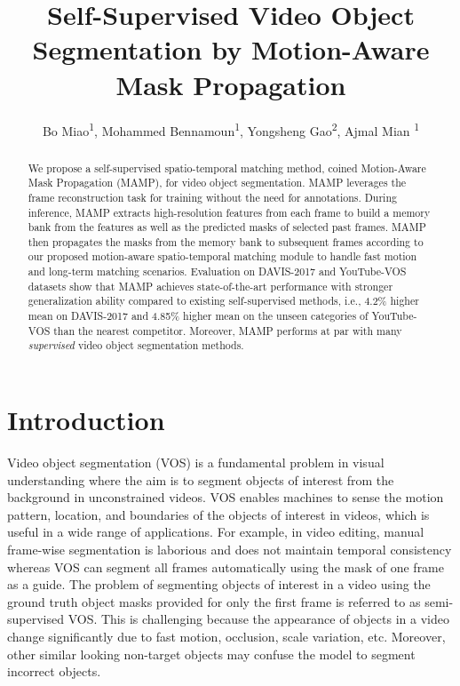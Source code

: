 \documentclass[letterpaper]{article} \usepackage{aaai22}  \usepackage{times}  \usepackage{helvet}  \usepackage{courier}  \usepackage[hyphens]{url}  \usepackage{graphicx} \urlstyle{rm} \def\UrlFont{\rm}  \usepackage{natbib}  \usepackage{caption} \DeclareCaptionStyle{ruled}{labelfont=normalfont,labelsep=colon,strut=off} \frenchspacing  \setlength{\pdfpagewidth}{8.5in}  \setlength{\pdfpageheight}{11in}  \usepackage{algorithm}
\title{Self-Supervised Video Object Segmentation by Motion-Aware Mask Propagation}
\author {
Bo Miao\textsuperscript{\rm 1},
    Mohammed Bennamoun\textsuperscript{\rm 1},
    Yongsheng Gao\textsuperscript{\rm 2},
    Ajmal Mian \textsuperscript{\rm 1}
}
\begin{document}
\maketitle


\begin{abstract}

We propose a self-supervised spatio-temporal matching method, coined Motion-Aware Mask Propagation (MAMP), for video object segmentation. MAMP leverages the frame reconstruction task for training without the need for annotations. During inference, MAMP extracts high-resolution features from each frame to build a memory bank from the features as well as the predicted masks of selected past frames. MAMP then propagates the masks from the memory bank to subsequent frames according to our proposed motion-aware spatio-temporal matching module to handle fast motion and long-term matching scenarios. Evaluation on DAVIS-2017 and YouTube-VOS datasets show that MAMP achieves state-of-the-art performance with stronger generalization ability compared to existing self-supervised methods, i.e., 4.2\% higher mean  on DAVIS-2017 and 4.85\% higher mean  on the unseen categories of YouTube-VOS than the nearest competitor. Moreover, MAMP performs at par with many {\em supervised} video object segmentation methods.
\end{abstract}

\section{Introduction}

Video object segmentation (VOS) is a fundamental problem in visual understanding where the aim is to segment objects of interest from the background in unconstrained videos. VOS enables machines to sense the motion pattern, location, and boundaries of the objects of interest in videos, which is useful in a wide range of applications. For example, in video editing, manual frame-wise segmentation is laborious and does not maintain temporal consistency whereas VOS can segment all frames automatically using the mask of one frame as a guide. The problem of segmenting objects of interest in a video using the ground truth object masks provided for only the first frame is referred to as semi-supervised VOS. This is challenging because the appearance of objects in a video change significantly due to fast motion, occlusion, scale variation, etc. Moreover, other similar looking non-target objects may confuse the model to segment incorrect objects.
\end{document}

